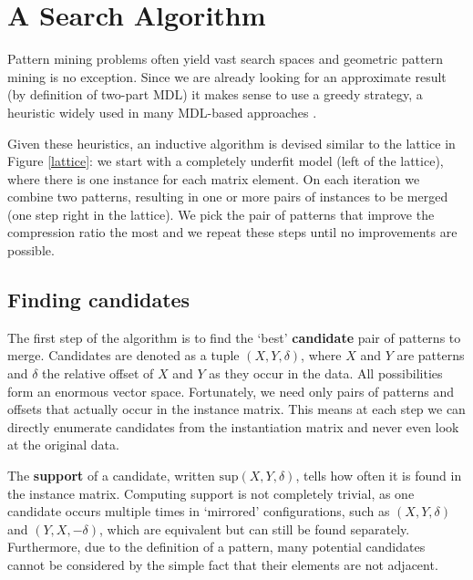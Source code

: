 \documentclass{llncs}
\begin{document}
\section{A Search Algorithm}

Pattern mining problems often yield vast search spaces and geometric pattern mining is no exception. Since we are already looking for an approximate result (by definition of two-part MDL) it makes sense to use a greedy strategy, a heuristic widely used in many MDL-based approaches \cite{krimp,slim,classy}. 


Given these heuristics, an inductive algorithm is devised similar to the lattice in Figure \ref{lattice}: we start with a completely underfit model (left of the lattice), where there is one instance for each matrix element. On each iteration we combine two patterns, resulting in one or more pairs of instances to be merged (one step right in the lattice). We pick the pair of patterns that improve the compression ratio the most and we repeat these steps until no improvements are possible.

\subsection{Finding candidates}

The first step of the algorithm is to find the `best' \textbf{candidate} pair of patterns to merge. Candidates are denoted as a tuple $(X,Y,\delta)$, where $X$ and $Y$ are patterns and $\delta$ the relative offset of $X$ and $Y$ as they occur in the data. All possibilities form an enormous vector space. Fortunately, we need only pairs of patterns and offsets that actually occur in the instance matrix. This means at each step we can directly enumerate candidates from the instantiation matrix and never even look at the original data.  

The \textbf{support} of a candidate, written $\mathrm{sup}(X,Y,\delta)$, tells how often it is found in the instance matrix. Computing support is not completely trivial, as one candidate occurs multiple times in `mirrored' configurations, such as $(X,Y,\delta)$ and $(Y,X,-\delta)$, which are equivalent but can still be found separately. Furthermore, due to the definition of a pattern, many potential candidates cannot be considered by the simple fact that their elements are not adjacent.
\end{document}
